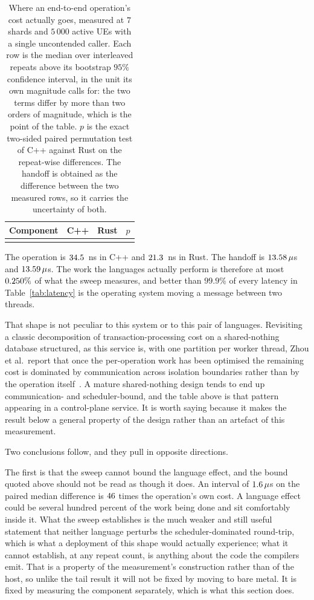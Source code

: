 \documentclass[english,twoside,openright,a4paper,censored,csm,software-track-2020]{HYthesisML}
\begin{document}
\begin{table}
\centering
\small
\caption[Where an end-to-end operation's cost actually goes]{Where an end-to-end operation's cost actually goes, measured at $7$ shards and
$5\,000$ active UEs with a single uncontended caller. Each row is the median over
\BudgetRepeats{} interleaved repeats above its bootstrap $95\%$ confidence interval, in the
unit its own magnitude calls for: the two terms differ by more than two orders of magnitude,
which is the point of the table. $p$ is the exact two-sided paired permutation test of C++
against Rust on the repeat-wise differences. The handoff is obtained as the difference between
the two measured rows, so it carries the uncertainty of both.\label{tab:budget}}
\begin{tabular}{@{}l r r r@{}}
\hline\hline
Component & C++ & Rust & $p$ \\
\hline
\\
\hline
\end{tabular}
\end{table}

The operation is $34.5$~ns in C++ and $21.3$~ns in Rust. The handoff is
$13.58\,\mu$s and $13.59\,\mu$s. The work the languages actually
perform is therefore at most $0.250\%$ of what the sweep measures, and better
than $99.9\%$ of every latency in Table~\ref{tab:latency} is the operating system moving a
message between two threads.

That shape is not peculiar to this system or to this pair of languages. Revisiting a classic
decomposition of transaction-processing cost on a shared-nothing database structured, as this
service is, with one partition per worker thread, Zhou et al.\ report that once the
per-operation work has been optimised the remaining cost is dominated by communication across
isolation boundaries rather than by the operation itself~\cite{zhou2025oltp}. A mature
shared-nothing design tends to end up communication- and scheduler-bound, and the table above is
that pattern appearing in a control-plane service. It is worth saying because it makes the result
below a general property of the design rather than an artefact of this measurement.

Two conclusions follow, and they pull in opposite directions.

The first is that the sweep cannot bound the language effect, and the bound quoted above should
not be read as though it does. An interval of $1.6\,\mu$s on the paired median
difference is $46$ times the operation's own cost. A language effect could be
several hundred percent of the work being done and sit comfortably inside it. What the sweep
establishes is the much weaker and still useful statement that neither language perturbs the
scheduler-dominated round-trip, which is what a deployment of this shape would actually
experience; what it cannot establish, at any repeat count, is anything about the code the
compilers emit. That is a property of the measurement's construction rather than of the host,
so unlike the tail result it will not be fixed by moving to bare metal. It is fixed by
measuring the component separately, which is what this section does.
\end{document}

